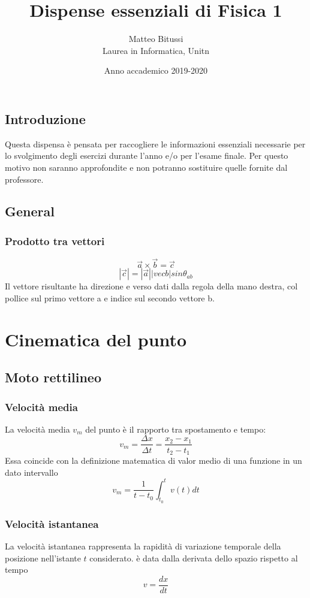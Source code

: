 \documentclass[a4paper]{report}
\title{Dispense essenziali di Fisica 1}
\author{Matteo Bitussi \\ Laurea in Informatica, Unitn}
\date{Anno accademico 2019-2020}
\begin{document}
  \maketitle

  \tableofcontents

  \section*{Introduzione}
  Questa dispensa è pensata per raccogliere le informazioni essenziali necessarie per lo svolgimento degli esercizi durante l'anno e/o per l'esame finale. Per questo motivo non saranno approfondite e non potranno sostituire quelle fornite dal professore.

  \section*{General}
  \subsection{Prodotto tra vettori}
  \[ \vec{a} \times \vec{b} = \vec{c} \]
  \[ |\vec{c}| = |\vec{a}||vec{b}| sin \theta_{ab} \]
  Il vettore risultante ha direzione e verso dati dalla regola della mano destra, col pollice sul primo vettore a e indice sul secondo vettore b.

  \chapter{Cinematica del punto}
  \section{Moto rettilineo}
  \subsection{Velocità media}
  La velocità media $v_m$ del punto è il rapporto tra spostamento e tempo:
  \[ v_m = \frac{\Delta x}{\Delta t} = \frac{x_2 - x_1}{t_2 - t_1} \]
  Essa coincide con la definizione matematica di valor medio di una funzione in un dato intervallo
  \[ v_m = \frac{1}{t-t_0} \int_{t_0}^t v(t) dt \]
  \subsection{Velocità istantanea}
  La velocità istantanea  rappresenta la rapidità di variazione temporale della posizione nell'istante $t$ considerato. è data dalla derivata dello spazio rispetto al tempo
  \[ v = \frac{dx}{dt} \]
\end{document}
